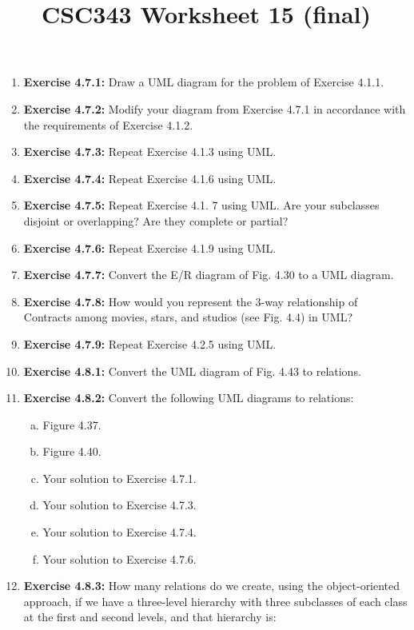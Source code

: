 \documentclass[12pt]{article}
\begin{document}
\title{CSC343 Worksheet 15 (final)}
\maketitle

\begin{enumerate}[1.]
    \item \textbf{Exercise 4.7.1:} Draw a UML diagram for the problem of Exercise 4.1.1.
    \item \textbf{Exercise 4.7.2:} Modify your diagram from Exercise 4.7.1 in accordance with the requirements of Exercise 4.1.2.
    \item \textbf{Exercise 4.7.3:} Repeat Exercise 4.1.3 using UML.
    \item \textbf{Exercise 4.7.4:} Repeat Exercise 4.1.6 using UML.
    \item \textbf{Exercise 4.7.5:} Repeat Exercise 4.1. 7 using UML. Are your subclasses disjoint or overlapping? Are they complete or partial?
    \item \textbf{Exercise 4.7.6:} Repeat Exercise 4.1.9 using UML.
    \item \textbf{Exercise 4.7.7:} Convert the E/R diagram of Fig. 4.30 to a UML diagram.
    \item \textbf{Exercise 4.7.8:} How would you represent the 3-way relationship of Contracts among movies, stars, and studios (see Fig. 4.4) in UML?
    \item \textbf{Exercise 4.7.9:} Repeat Exercise 4.2.5 using UML.
    \item \textbf{Exercise 4.8.1:} Convert the UML diagram of Fig. 4.43 to relations.
    \item \textbf{Exercise 4.8.2:} Convert the following UML diagrams to relations:

    \begin{enumerate}[a)]
        \item Figure 4.37.
        \item Figure 4.40.
        \item Your solution to Exercise 4.7.1.
        \item Your solution to Exercise 4.7.3.
        \item Your solution to Exercise 4.7.4.
        \item Your solution to Exercise 4.7.6.
    \end{enumerate}

    \item \textbf{Exercise 4.8.3:} How many relations do we create, using the object-oriented
    approach, if we have a three-level hierarchy with three subclasses of each class
    at the first and second levels, and that hierarchy is:


\end{enumerate}
\end{document}
